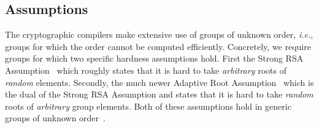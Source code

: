 
\subsection{Assumptions}

The cryptographic compilers make extensive use of groups of unknown order, \emph{i.e.}, groups for which the order cannot be computed efficiently.
Concretely, we require groups for which two specific hardness assumptions hold.
First the Strong RSA Assumption~\cite{EC:BarPfi97} which roughly states that it is hard to take \emph{arbitrary} roots of \emph{random} elements. Secondly, the much newer Adaptive Root Assumption~\cite{EC:Wesolowski19} which is the dual of the Strong RSA Assumption and states that it is hard to take \emph{random} roots of \emph{arbitrary} group elements. 
Both of these assumptions hold in generic groups of unknown order~\cite{EC:DamKop02,C:BonBunFis19}. %

